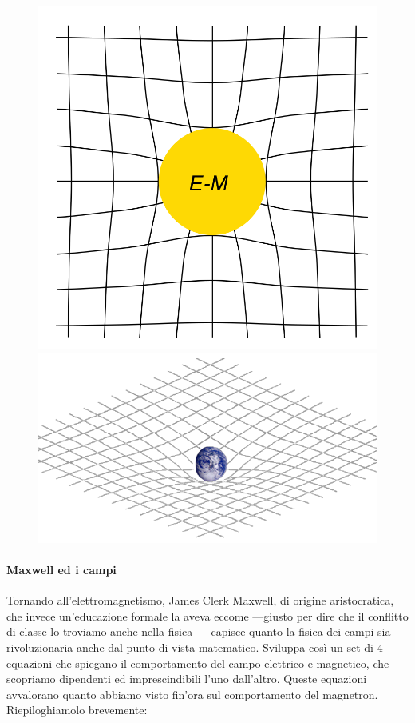 \documentclass{article}
\begin{document}
\begin{figure}[h]
    \centering
    \includegraphics[scale=0.20]{10.png} 
    \includegraphics[scale=0.20]{11.png} 
    \label{example}
\end{figure}
\paragraph{Maxwell ed i campi}
Tornando all'elettromagnetismo, James Clerk Maxwell, di origine aristocratica, che invece un'educazione formale la aveva eccome —giusto per dire che il conflitto di classe lo troviamo anche nella fisica — capisce quanto la fisica dei campi sia rivoluzionaria anche dal punto di vista matematico. Sviluppa così un set di 4 equazioni che spiegano il comportamento del campo elettrico e magnetico, che scopriamo dipendenti ed imprescindibili l'uno dall'altro.
Queste equazioni avvalorano quanto abbiamo visto fin'ora sul comportamento del magnetron. Riepiloghiamolo brevemente:
\end{document}
